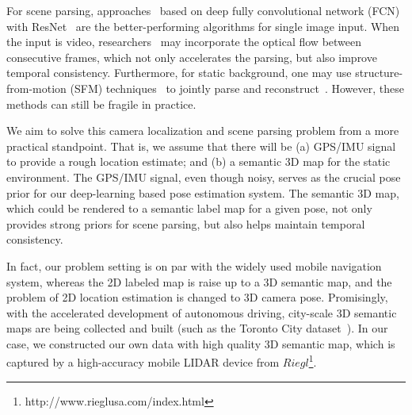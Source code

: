 For scene parsing, approaches~\cite{ZhaoSQWJ16,ChenPSA17} based on deep fully convolutional network (FCN) with ResNet~\cite{HeZRS15} are the better-performing algorithms for single image input. When the input is video, researchers~\cite{kundu2016feature,zhu2016deep} may incorporate the optical flow between consecutive frames, which not only accelerates the parsing, but also improve temporal consistency. Furthermore, for static background, one may use structure-from-motion (SFM) techniques~\cite{wu2011visualsfm} to jointly parse and reconstruct~\cite{kundu2014joint}. However, these methods can still be fragile in practice.

We aim to solve this camera localization and scene parsing problem from a more practical standpoint. That is, we assume that there will be (a) GPS/IMU signal to provide a rough location estimate; and (b) a semantic 3D map for the static environment. The GPS/IMU signal, even though noisy, serves as the crucial pose prior for our deep-learning based pose estimation system. The semantic 3D map, which could be rendered to a semantic label map for a given pose, not only provides strong priors for scene parsing, but also helps maintain temporal consistency. 

%
In fact, our problem setting is on par with the widely used mobile navigation system, whereas the 2D labeled map is raise up to a 3D semantic map, and the problem of 2D location estimation is changed to 3D camera pose. Promisingly, with the accelerated development of autonomous driving, city-scale 3D semantic maps are being collected and built (such as the Toronto City dataset~\cite{wang2016torontocity}).  In our case, we constructed our own data with high quality 3D semantic map, which is captured by a high-accuracy mobile LIDAR device from $Riegl$\footnote{http://www.rieglusa.com/index.html}. 


